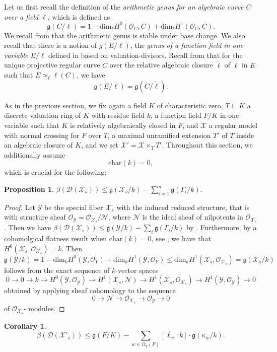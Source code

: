 \documentclass[a4paper,12pt,reqno]{amsart}
\newcommand\mc\mathcal
\newtheorem{prop}[thm]{Proposition}
\newtheorem{cor}[thm]{Corollary}
\theoremstyle{definition}
\numberwithin{equation}{thm}
\renewcommand{\leq}{\leqslant}
\begin{document}
Let us first recall the definition of the \textit{arithmetic genus for an algebraic curve $C$ over a field $\ell$}, which is defined as
$$\mathfrak{g}(C/\ell)=1 - \mathrm{dim}_\ell H^0(\mathcal{O}_C, C) +\mathrm{dim}_\ell H^1(\mathcal{O}_C, C).$$
We recall from \cite[Corollary 5.2.27]{Liu} that the arithmetic genus is stable under base change. 
We also recall that there is a notion of $g(E/\ell)$, the \textit{genus of a function field in one variable $E/\ell$} defined in \cite{Deu} based on valuation-divisors. Recall from \cite[Proposition 2.1]{BG24} that for the unique projective regular curve $C$ over the relative algebraic closure $\widetilde{\ell}$ of $\ell$ in $E$ such that $E \simeq_\ell \ell(C)$, we have
$$\mathfrak{g}(E/\ell)= \mathfrak{g}(C/\widetilde{\ell}).$$  

As in the previous section, we fix again a field $K$ of characteristic zero, $T \subseteq K$ a discrete valuation ring of $K$ with residue field $k$, a function field $F/K$ 
 in one variable such that $K$ is relatively algebraically closed in $F$, and $\mc{X}$ a regular model with normal crossing for $F$ over $T$,  a maximal unramified extension $T'$ of $T$ inside an algebraic closure of $K$, and we set $\mc{X}'=\mc{X} \times_T T'$. Throughout this section, we additionally assume $$\mathrm{char}(k)=0,$$
 which is crucial for the following:
\begin{prop}\label{reducing the curve}
$\beta(\mathcal{D}(\mc{X}_s)) \leq  \mathfrak{g}(\mc{X}_{s}/k) - \sum_{i=1}^n \mathfrak{g}(\Gamma_i/k).$
\end{prop}
\begin{proof}
Let $\mathcal{Y}$ be the special fiber  $\mathcal{X}_s$ with the induced reduced structure, that is with structure sheaf $\mc{O}_{\mc{Y}}= \mc{O}_{\mc{X}_s}/\mc{N}$, where $\mc{N}$ is the ideal sheaf of nilpotents in $\mc{O}_{\mc{X}_s}$. Then we have $\beta(\mc{D}(\mathcal{X}_s)) \leq  \mathfrak{g}(\mc{Y}/k) - \sum_i \mathfrak{g}(\Gamma_i/k)$ by \cite[Proposition 10.1.51]{Liu}. Furthermore, by a cohomolgical flatness result when $\mathrm{char}(k)=0$, see \cite[Proposition 6.4.2]{Ray70}, we have that  $H^0(\mc{X}_s, \mathcal{O}_{\mc{X}_s})=k$.
Then  $$\mathfrak{g}(\mc{Y}/k) = 1 - \mathrm{dim}_k  H^0(\mc{Y}, \mathcal{O}_{Y}) + \mathrm{dim}_k H^1(\mc{Y}, \mathcal{O}_{Y}) \leq \mathrm{dim}_k H^1(\mc{X}_s, \mathcal{O}_{\mc{X}_s}) =\mathfrak{g}(\mc{X}_{s}/k)$$
follows from the exact sequence of $k$-vector spaces $$0 \to 0 \to k \to H^0(\mc{Y}, \mc{O}_\mc{Y}) \to  H^1(\mc{X}_s, \mc{N})\to H^1(\mc{X}_s,\mc{O}_{\mc{X}_s})  \to H^1(\mc{Y},\mc{O}_{\mc{Y}}) \to 0$$ obtained by applying sheaf cohomology to the sequence 
$$ 0 \to \mc{N} \to \mc{O}_{\mc{X}_s} \to \mc{O}_\mc{Y} \to 0$$
of  $\mc{O}_{\mc{X}_s}$- modules.
\end{proof}
\begin{cor}\label{Betti-Genus}
$$\beta(\mathcal{D}(\mc{X'}_s)) \leq  \mathfrak{g}(F/K) - \sum_{w \in \Omega_T(F)} [\ell_w:k]\cdot \mathfrak{g}(\kappa_w/k).$$
\end{cor}
\end{document}

